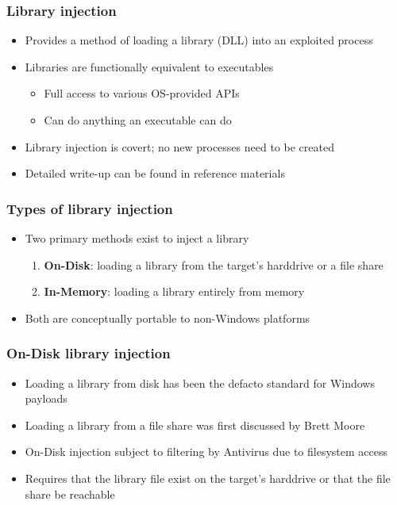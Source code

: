 \documentclass{beamer}
\newenvironment{sitemize}{\vspace{1mm}\begin{itemize}\itemsep 4pt\small}{\end{itemize}}
\newenvironment{senumerate}{\vspace{1mm}\begin{enumerate}\itemsep 4pt\small}{\end{enumerate}}
\begin{document}
\begin{frame}[t]
    \frametitle{Library injection}

    \begin{sitemize}
        \item Provides a method of loading a
        library (DLL) into an exploited process

        \pause
        \item Libraries are functionally equivalent to executables
        \begin{sitemize}
            \item Full access to various OS-provided APIs
            \item Can do anything an executable can do
        \end{sitemize}

        \pause
        \item Library injection is covert; no new processes
        need to be created

        \pause
        \item Detailed write-up can be found in reference materials
    \end{sitemize}
\end{frame}

\begin{frame}[t]
    \frametitle{Types of library injection}

    \begin{sitemize}
        \item Two primary methods exist to inject a library
        \begin{senumerate}
            \item \textbf{On-Disk}: loading a library from the target's
            harddrive or a file share
            \item \textbf{In-Memory}: loading a library entirely from memory
        \end{senumerate}
        \item Both are conceptually portable to non-Windows platforms
    \end{sitemize}
\end{frame}

\begin{frame}[t]
    \frametitle{On-Disk library injection}

    \begin{sitemize}
        \item Loading a library from disk has been the defacto
        standard for Windows payloads
        \item Loading a library from a file share was first
        discussed by Brett Moore
    \end{sitemize}

    \pause
    \begin{sitemize}
        \item On-Disk injection subject to filtering by Antivirus due to
            filesystem access
        \item Requires that the library file exist on the target's
            harddrive or that the file share be reachable
    \end{sitemize}
\end{frame}
\end{document}
